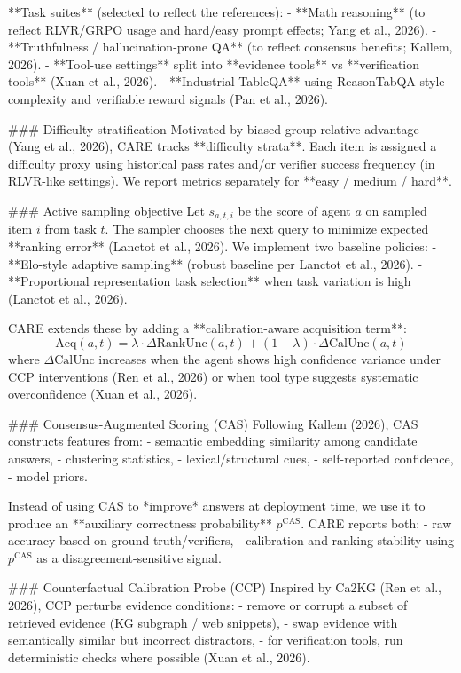 **Task suites** (selected to reflect the references):
- **Math reasoning** (to reflect RLVR/GRPO usage and hard/easy prompt effects; Yang et al., 2026).
- **Truthfulness / hallucination-prone QA** (to reflect consensus benefits; Kallem, 2026).
- **Tool-use settings** split into **evidence tools** vs **verification tools** (Xuan et al., 2026).
- **Industrial TableQA** using ReasonTabQA-style complexity and verifiable reward signals (Pan et al., 2026).

### Difficulty stratification
Motivated by biased group-relative advantage (Yang et al., 2026), CARE tracks **difficulty strata**. Each item is assigned a difficulty proxy using historical pass rates and/or verifier success frequency (in RLVR-like settings). We report metrics separately for **easy / medium / hard**.

### Active sampling objective
Let \(s_{a,t,i}\) be the score of agent \(a\) on sampled item \(i\) from task \(t\). The sampler chooses the next query to minimize expected **ranking error** (Lanctot et al., 2026). We implement two baseline policies:
- **Elo-style adaptive sampling** (robust baseline per Lanctot et al., 2026).
- **Proportional representation task selection** when task variation is high (Lanctot et al., 2026).

CARE extends these by adding a **calibration-aware acquisition term**:
\[
\text{Acq}(a,t)= \lambda \cdot \Delta \text{RankUnc}(a,t) + (1-\lambda)\cdot \Delta \text{CalUnc}(a,t)
\]
where \(\Delta \text{CalUnc}\) increases when the agent shows high confidence variance under CCP interventions (Ren et al., 2026) or when tool type suggests systematic overconfidence (Xuan et al., 2026).

### Consensus-Augmented Scoring (CAS)
Following Kallem (2026), CAS constructs features from:
- semantic embedding similarity among candidate answers,
- clustering statistics,
- lexical/structural cues,
- self-reported confidence,
- model priors.

Instead of using CAS to *improve* answers at deployment time, we use it to produce an **auxiliary correctness probability** \(p^\text{CAS}\). CARE reports both:
- raw accuracy based on ground truth/verifiers,
- calibration and ranking stability using \(p^\text{CAS}\) as a disagreement-sensitive signal.

### Counterfactual Calibration Probe (CCP)
Inspired by Ca2KG (Ren et al., 2026), CCP perturbs evidence conditions:
- remove or corrupt a subset of retrieved evidence (KG subgraph / web snippets),
- swap evidence with semantically similar but incorrect distractors,
- for verification tools, run deterministic checks where possible (Xuan et al., 2026).

